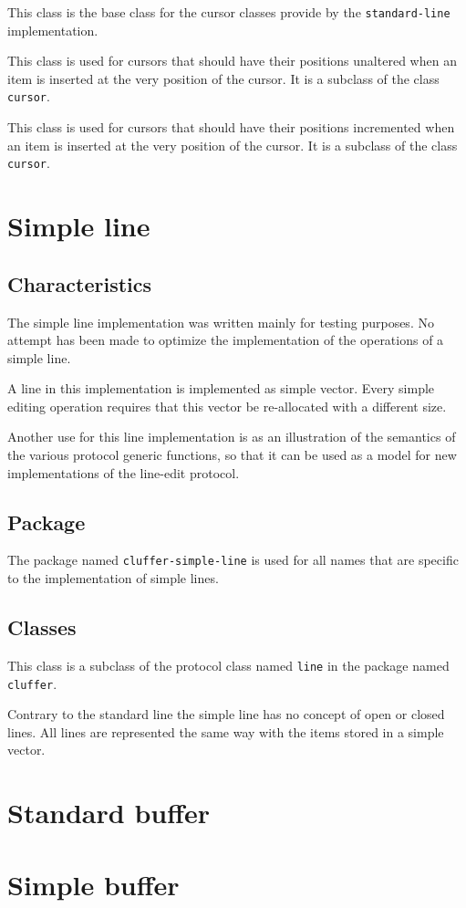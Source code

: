 This class is the base class for the cursor classes provide by the
\texttt{standard-line} implementation.


This class is used for cursors that should have their positions
unaltered when an item is inserted at the very position of the
cursor.   It is a subclass of the class \texttt{cursor}.


This class is used for cursors that should have their positions
incremented when an item is inserted at the very position of the
cursor.   It is a subclass of the class \texttt{cursor}.

\section{Simple line}

\subsection{Characteristics}

The simple line implementation was written mainly for testing
purposes.  No attempt has been made to optimize the implementation of
the operations of a simple line.

A line in this implementation is implemented as \commonlisp{} simple
vector.  Every simple editing operation requires that this vector be
re-allocated with a different size.

Another use for this line implementation is as an illustration of the
semantics of the various protocol generic functions, so that it can be
used as a model for new implementations of the line-edit protocol.

\subsection{Package}

The package named \texttt{cluffer-simple-line} is used for all names
that are specific to the implementation of simple lines.

\subsection{Classes}


This class is a subclass of the protocol class named \texttt{line} in
the package named \texttt{cluffer}.

Contrary to the standard line  the simple
line has no concept of open or closed lines.  All lines are
represented the same way with the items stored in a simple
\commonlisp{} vector.

\section{Standard buffer}

\section{Simple buffer}
